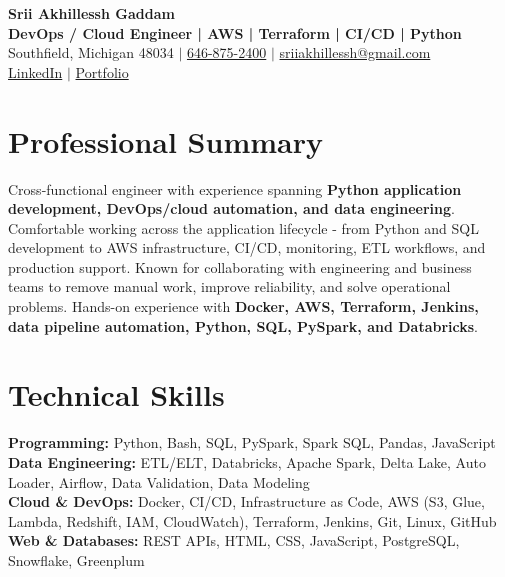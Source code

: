 \documentclass[letterpaper,10pt]{article}
\begin{document}
\fontsize{9.35pt}{10.45pt}\selectfont

\begin{center}
    {\LARGE \textbf{Srii Akhillessh Gaddam}} \\[-1pt]
    \textbf{DevOps / Cloud Engineer | AWS | Terraform | CI/CD | Python} \\[2pt]
    Southfield, Michigan 48034 $|$
    \href{tel:6468752400}{646-875-2400} $|$
    \href{mailto:sriiakhillessh@gmail.com}{sriiakhillessh@gmail.com} \\[1pt]
    \href{https://www.linkedin.com/in/srii-akhiilessh-gaddam-b48668191/}{LinkedIn} $|$
    \href{https://sriiakhillesshg.github.io/portfolio/}{Portfolio}
\end{center}
\vspace{-8pt}

\section{Professional Summary}
\small{Cross-functional engineer with experience spanning \textbf{Python application development, DevOps/cloud automation, and data engineering}. Comfortable working across the application lifecycle - from Python and SQL development to AWS infrastructure, CI/CD, monitoring, ETL workflows, and production support. Known for collaborating with engineering and business teams to remove manual work, improve reliability, and solve operational problems. Hands-on experience with \textbf{Docker, AWS, Terraform, Jenkins, data pipeline automation, Python, SQL, PySpark, and Databricks}.}

\section{Technical Skills}
\small{
\textbf{Programming:} Python, Bash, SQL, PySpark, Spark SQL, Pandas, JavaScript \\
\textbf{Data Engineering:} ETL/ELT, Databricks, Apache Spark, Delta Lake, Auto Loader, Airflow, Data Validation, Data Modeling \\
\textbf{Cloud \& DevOps:} Docker, CI/CD, Infrastructure as Code, AWS (S3, Glue, Lambda, Redshift, IAM, CloudWatch), Terraform, Jenkins, Git, Linux, GitHub \\
\textbf{Web \& Databases:} REST APIs, HTML, CSS, JavaScript, PostgreSQL, Snowflake, Greenplum
}
\end{document}
